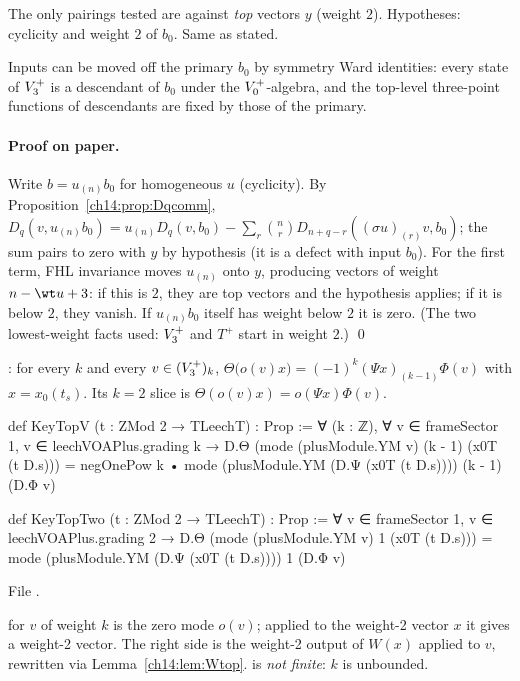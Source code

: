 \begin{dictionary}
The only pairings tested are against \emph{top} vectors $y$ (weight $2$).  Hypotheses: cyclicity and
weight $2$ of $b_0$.  Same as stated.
\end{dictionary}

\begin{physics}
Inputs can be moved off the primary $b_0$ by symmetry Ward identities: every state of $V_3^{+}$ is a
descendant of $b_0$ under the $V_0^{+}$-algebra, and the top-level three-point functions of
descendants are fixed by those of the primary.
\end{physics}

\paragraph{Proof on paper.}  Write $b=u_{(n)}b_0$ for homogeneous $u$ (cyclicity).  By
Proposition~\ref{ch14:prop:Dqcomm}, $D_q(v,u_{(n)}b_0)=u_{(n)}D_q(v,b_0)-\sum_r\binom nr D_{n+q-r}((\sigma u)_{(r)}v,b_0)$;
the sum pairs to zero with $y$ by hypothesis (it is a defect with input $b_0$).  For the first term,
FHL invariance moves $u_{(n)}$ onto $y$, producing vectors of weight $n-\wt u+3$: if this is $2$, they are
top vectors and the hypothesis applies; if it is below $2$, they vanish.  If $u_{(n)}b_0$ itself has weight
below $2$ it is zero.  (The two lowest-weight facts used: $V_3^{+}$ and $T^+$ start in weight $2$.) \qed

\begin{definition}\label{ch14:def:keytopv}
: for every $k$ and every $v\in(V_3^{+})_k$,
$\Theta\bigl(o(v)x\bigr)=(-1)^k(\Psi x)_{(k-1)}\Phi(v)$ with $x=x_0(t_s)$.  Its $k=2$ slice
 is $\Theta(o(v)x)=o(\Psi x)\Phi(v)$.
\end{definition}
\begin{leancode}
def KeyTopV (t : ZMod 2 → TLeechT) : Prop :=
  ∀ (k : ℤ), ∀ v ∈ frameSector 1, v ∈ leechVOAPlus.grading k →
    D.Θ (mode (plusModule.YM v) (k - 1) (x0T (t D.s)))
      = negOnePow k • mode (plusModule.YM (D.Ψ (x0T (t D.s)))) (k - 1) (D.Φ v)

def KeyTopTwo (t : ZMod 2 → TLeechT) : Prop :=
  ∀ v ∈ frameSector 1, v ∈ leechVOAPlus.grading 2 →
    D.Θ (mode (plusModule.YM v) 1 (x0T (t D.s)))
      = mode (plusModule.YM (D.Ψ (x0T (t D.s)))) 1 (D.Φ v)
\end{leancode}
File .

\begin{dictionary}
 for $v$ of weight $k$ is the zero mode $o(v)$; applied to the weight-2
vector $x$ it gives a weight-2 vector.  The right side is the weight-2 output of $W(x)$ applied to $v$,
rewritten via Lemma~\ref{ch14:lem:Wtop}.   is \emph{not finite}: $k$ is unbounded.
\end{dictionary}

